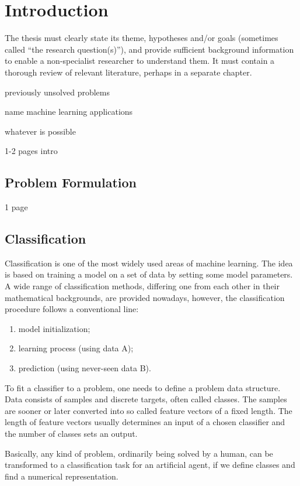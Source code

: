 \chapter{Introduction} \label{chapter:01:introduction}

The thesis must clearly state its theme, hypotheses and/or goals (sometimes called “the research question(s)”), and provide sufficient background information to enable a non-specialist researcher to understand them. It must contain a thorough review of relevant literature, perhaps in a separate chapter.

previously unsolved problems

name machine learning applications

whatever is possible

1-2 pages intro

\newpage
\section{Problem Formulation}
1 page

\newpage
\section{Classification} \label{sec:soa_other_classifiers}
Classification is one of the most widely used areas of machine learning. The idea is based on training a model on a set of data by setting some model parameters. A wide range of classification methods, differing one from each other in their mathematical backgrounds, are provided nowadays, however, the classification procedure follows a conventional line:

\begin{enumerate}
\item model initialization;
\item learning process (using data A);
\item prediction (using never-seen data B).
\end{enumerate}

To fit a classifier to a problem, one needs to define a problem data structure. Data consists of samples and discrete targets, often called classes. The samples are sooner or later converted into so called feature vectors of a fixed length. The length of feature vectors usually determines an input of a chosen classifier and the number of classes sets an output.

Basically, any kind of problem, ordinarily being solved by a human, can be transformed to a classification task for an artificial agent, if we define classes and find a numerical representation.

